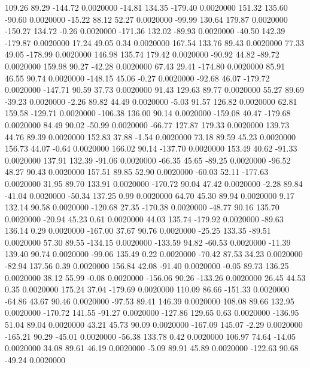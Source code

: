   109.26   89.29 -144.72   0.0020000
  -14.81  134.35 -179.40   0.0020000
  151.32  135.60  -90.60   0.0020000
  -15.22   88.12   52.27   0.0020000
  -99.99  130.64  179.87   0.0020000
 -150.27  134.72   -0.26   0.0020000
 -171.36  132.02  -89.93   0.0020000
  -40.50  142.39 -179.87   0.0020000
   17.24   49.05    0.34   0.0020000
  167.54  133.76   89.43   0.0020000
   77.33   49.05 -178.99   0.0020000
  146.98  135.74  179.42   0.0020000
  -90.92   44.82  -89.72   0.0020000
  159.98   90.27  -42.28   0.0020000
   67.43   29.41 -174.80   0.0020000
   85.91   46.55   90.74   0.0020000
 -148.15   45.06   -0.27   0.0020000
  -92.68   46.07 -179.72   0.0020000
 -147.71   90.59   37.73   0.0020000
   91.43  129.63   89.77   0.0020000
   55.27   89.69  -39.23   0.0020000
   -2.26   89.82   44.49   0.0020000
   -5.03   91.57  126.82   0.0020000
   62.81  159.58 -129.71   0.0020000
 -106.38  136.00   90.14   0.0020000
 -159.08   40.47 -179.68   0.0020000
   84.49   90.02  -50.99   0.0020000
  -66.77  127.87  179.33   0.0020000
  139.73   44.76   89.39   0.0020000
  152.83   37.88   -1.54   0.0020000
   73.18   89.59   45.23   0.0020000
  156.73   44.07   -0.64   0.0020000
  166.02   90.14 -137.70   0.0020000
  153.49   40.62  -91.33   0.0020000
  137.91  132.39  -91.06   0.0020000
  -66.35   45.65  -89.25   0.0020000
  -96.52   48.27   90.43   0.0020000
  157.51   89.85   52.90   0.0020000
  -60.03   52.11 -177.63   0.0020000
   31.95   89.70  133.91   0.0020000
 -170.72   90.04   47.42   0.0020000
   -2.28   89.84  -41.04   0.0020000
  -50.34  137.25    0.99   0.0020000
   64.70   45.30   89.94   0.0020000
    9.17  132.14   90.58   0.0020000
 -120.68   27.35 -170.38   0.0020000
  -48.77   90.16  135.70   0.0020000
  -20.94   45.23    0.61   0.0020000
   44.03  135.74 -179.92   0.0020000
  -89.63  136.14    0.29   0.0020000
 -167.00   37.67   90.76   0.0020000
  -25.25  133.35  -89.51   0.0020000
   57.30   89.55 -134.15   0.0020000
 -133.59   94.82  -60.53   0.0020000
  -11.39  139.40   90.74   0.0020000
  -99.06  135.49    0.22   0.0020000
  -70.42   87.53   34.23   0.0020000
  -82.94  137.56    0.39   0.0020000
  156.84   42.08  -91.40   0.0020000
   -0.05   89.73  136.25   0.0020000
   38.12   55.99   -0.08   0.0020000
 -156.06   90.26 -133.26   0.0020000
   26.45   44.53    0.35   0.0020000
  175.24   37.04 -179.69   0.0020000
  110.09   86.66 -151.33   0.0020000
  -64.86   43.67   90.46   0.0020000
  -97.53   89.41  146.39   0.0020000
  108.08   89.66  132.95   0.0020000
 -170.72  141.55  -91.27   0.0020000
 -127.86  129.65    0.63   0.0020000
 -136.95   51.04   89.04   0.0020000
   43.21   45.73   90.09   0.0020000
 -167.09  145.07   -2.29   0.0020000
 -165.21   90.29  -45.01   0.0020000
  -56.38  133.78    0.42   0.0020000
  106.97   74.64  -14.05   0.0020000
   34.08   89.61   46.19   0.0020000
   -5.09   89.91   45.89   0.0020000
 -122.63   90.68  -49.24   0.0020000
